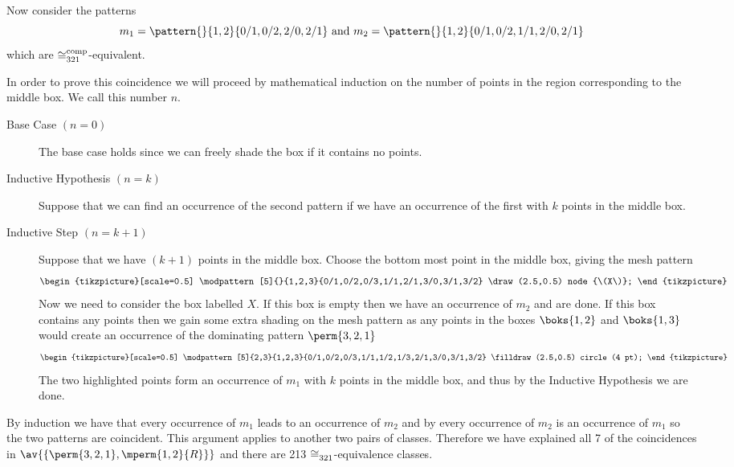 Now consider the patterns
\begin{equation*}
    m_1 = \pattern{}{1,2}{0/1,0/2,2/0,2/1} \text{ and } m_2 = \pattern{}{1,2}{0/1,0/2,1/1,2/0,2/1}
\end{equation*}
which are \(\coinc[comp]{321}\)-equivalent.

In order to prove this coincidence we will proceed by mathematical
induction on the number of points in the region corresponding to the middle box.
We call this number \(n\).
\begin{description}
    \item [Base Case \((n=0)\)] The base case holds since we can freely shade the
        box if it contains no points.
    \item [Inductive Hypothesis \((n=k)\)] Suppose that we can find an occurrence
        of the second pattern if we have an occurrence of the first with \(k\) points
        in the middle box.
    \item [Inductive Step \((n=k+1)\)] Suppose that we have \((k+1)\) points in
        the middle box. Choose the bottom most point in the middle box, giving the
        mesh pattern
     \begin{equation*}
        \begin{tikzpicture}[scale=0.5]
            \modpattern[5]{}{1,2,3}{0/1,0/2,0/3,1/1,2/1,3/0,3/1,3/2}
            \draw (2.5,0.5) node {\(X\)};
        \end{tikzpicture}
    \end{equation*}
        Now we need to consider the box labelled \(X\). If this box is empty
        then we have an occurrence of \(m_2\) and are done. If this box contains
        any points then we gain some extra shading on the mesh pattern as any
        points in the boxes \(\boks{1,2}\) and \(\boks{1,3}\) would create an
        occurrence of the dominating pattern \(\perm{3,2,1}\)
     \begin{equation*}
        \begin{tikzpicture}[scale=0.5]
            \modpattern[5]{2,3}{1,2,3}{0/1,0/2,0/3,1/1,1/2,1/3,2/1,3/0,3/1,3/2}
            \filldraw (2.5,0.5) circle (4 pt);
        \end{tikzpicture}
    \end{equation*}
        The two highlighted points form an occurrence of \(m_1\) with \(k\)
        points in the middle box, and thus by the Inductive Hypothesis we
        are done.
\end{description}
By induction we have that every occurrence of \(m_1\) leads to an occurrence of \(m_2\)
and by  every occurrence of \(m_2\) is an occurrence of
\(m_1\) so the two patterns are coincident.
This argument applies to another two pairs of classes. Therefore we have
explained all 7 of the coincidences in \(\av{\{\perm{3,2,1}, \mperm{1,2}{R}\}}\)
and there are 213 \(\coinc{321}\)-equivalence classes.
